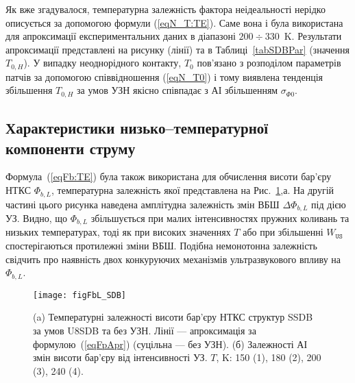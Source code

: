 Як вже згадувалося, температурна залежність фактора неідеальності нерідко описується за допомогою формули (\ref{eqN_T:TE}).
Саме вона і була використана для апроксимації експериментальних даних в діапазоні $200\div330$~K.
Результати апроксимації представлені на рисунку (лінії) та в Таблиці~\ref{tabSDBPar} (значення $T_{0,H}$).
У випадку неоднорідного контакту, $T_0$ пов'язано з розподілом параметрів патчів
за допомогою співвідношення (\ref{eqN_T0}) і тому виявлена тенденція
збільшення $T_{0,H}$ за умов УЗН якісно співпадає з АІ збільшенням $\sigma_{\Phi0}$.





\subsection{Характеристики низько--температурної компоненти струму}

Формула~(\ref{eqFb:TE}) була також використана для обчислення висоти бар'єру НТКС $\Phi_{b,L}$, температурна залежність
якої представлена на Рис.~\ref{figFbL_SDB},а.
На другій частині цього рисунка наведена амплітудна залежність змін ВБШ $\Delta \Phi_{b,L}$ під дією УЗ.
Видно, що $\Phi_{b,L}$ збільшується при малих інтенсивностях пружних коливань та низьких температурах,
тоді як при високих значеннях $T$ або при збільшенні $W_\mathtt{US}$ спостерігаються протилежні зміни ВБШ.
Подібна немонотонна залежність свідчить про наявність двох конкуруючих механізмів ультразвукового впливу на $\Phi_{b,L}$.


\begin{figure}
\center
\texttt{[image: figFbL\_SDB]}
\caption{\label{figFbL_SDB}
(a) Температурні залежності висоти бар'єру НТКС структур SSDB за умов U8SDB та без УЗН.
Лінії --- апроксимація за формулою~(\ref{eqFpApr}) (суцільна --- без УЗН).
(б) Залежності АІ змін висоти бар'єру від інтенсивності УЗ.
$T$, K: 150 (1), 180 (2), 200 (3), 240 (4).
}%
\end{figure}

